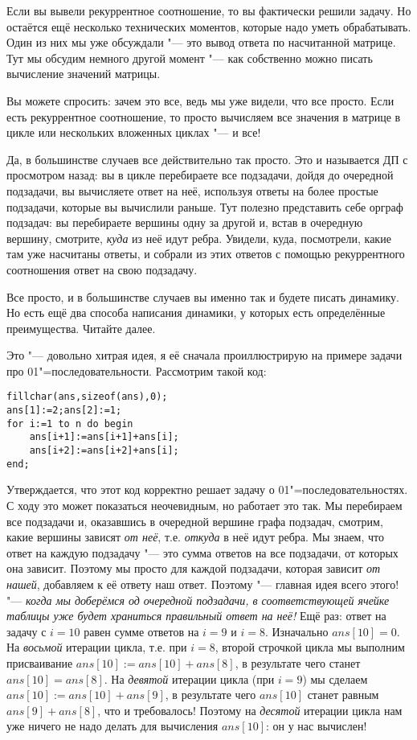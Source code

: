 Если вы вывели рекуррентное соотношение, то вы фактически решили задачу. Но остаётся ещё несколько
технических моментов, которые надо уметь обрабатывать. Один из них мы уже обсуждали "--- это вывод
ответа по насчитанной матрице. Тут мы обсудим немного другой момент "--- как собственно можно писать
вычисление значений матрицы.

Вы можете спросить: зачем это все, ведь мы уже видели, что все просто. Если есть рекуррентное
соотношение, то просто вычисляем все значения в матрице в цикле или нескольких вложенных циклах "---
и все!

Да, в большинстве случаев все действительно так просто. Это и называется ДП с просмотром назад: вы в цикле перебираете все подзадачи, дойдя до очередной подзадачи, вы вычисляете ответ на неё, используя ответы на более простые подзадачи, которые вы вычислили раньше. Тут полезно представить себе орграф подзадач: вы перебираете вершины одну за другой и, встав в очередную вершину, смотрите, \textit{куда} из неё идут ребра. Увидели, куда, посмотрели, какие там уже насчитаны ответы, и собрали из этих ответов с помощью рекуррентного соотношения ответ на свою подзадачу.

Все просто, и в большинстве случаев вы именно так и будете писать динамику. Но есть ещё два способа написания динамики, у которых есть определённые преимущества. Читайте далее.

  Это "--- довольно хитрая идея, я её сначала проиллюстрирую на примере задачи про 01"=последовательности. Рассмотрим такой код:
\begin{codesampleo}\begin{verbatim}
fillchar(ans,sizeof(ans),0);
ans[1]:=2;ans[2]:=1;
for i:=1 to n do begin
    ans[i+1]:=ans[i+1]+ans[i];
    ans[i+2]:=ans[i+2]+ans[i];
end;
\end{verbatim}
\end{codesampleo}
Утверждается, что этот код корректно решает задачу о 01"=последовательностях. С ходу это может показаться неочевидным, но работает это так. Мы перебираем все подзадачи и, оказавшись в очередной вершине графа подзадач, смотрим, какие вершины зависят \textit{от неё}, т.е. \textit{откуда} в неё идут ребра. Мы знаем, что ответ на каждую подзадачу "--- это сумма ответов на все подзадачи, от которых она зависит. Поэтому мы просто для каждой подзадачи, которая зависит \textit{от нашей}, добавляем к её ответу наш ответ. Поэтому "--- главная идея всего этого! "--- \textit{когда мы доберёмся од очередной подзадачи, в соответствующей ячейке таблицы уже будет храниться правильный ответ на неё!} Ещё раз: ответ на задачу с $i=10$ равен сумме ответов на $i=9$ и $i=8$. Изначально $ans[10]=0$. На \textit{восьмой} итерации цикла, т.е. при $i=8$, второй строчкой цикла мы выполним присваивание $ans[10]:=ans[10]+ans[8]$, в результате чего станет $ans[10]=ans[8]$. На \textit{девятой} итерации цикла (при $i=9$) мы сделаем $ans[10]:=ans[10]+ans[9]$, в результате чего $ans[10]$ станет равным $ans[9]+ans[8]$, что и требовалось! Поэтому на \textit{десятой} итерации цикла нам уже ничего не надо делать для вычисления $ans[10]$: он у нас вычислен!

